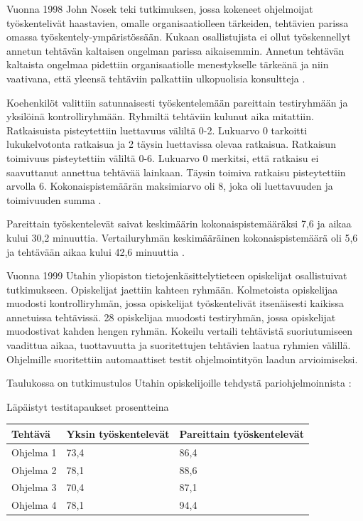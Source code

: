 \documentclass[finnish]{tktltiki2}
\theoremstyle{definition}
\theoremstyle{remark}
\begin{document}
Vuonna 1998 John Nosek teki tutkimuksen, jossa kokeneet ohjelmoijat työskentelivät haastavien, omalle organisaatiolleen tärkeiden, tehtävien parissa omassa työskentely-ympäristössään. Kukaan osallistujista ei ollut työskennellyt annetun tehtävän kaltaisen ongelman parissa aikaisemmin. Annetun tehtävän kaltaista ongelmaa pidettiin organisaatiolle menestykselle tärkeänä ja niin vaativana, että yleensä tehtäviin palkattiin ulkopuolisia konsultteja \cite{NOS98}.

Koehenkilöt valittiin satunnaisesti työskentelemään pareittain testiryhmään ja yksilöinä kontrolliryhmään.
Ryhmiltä tehtäviin kulunut aika mitattiin. Ratkaisuista pisteytettiin luettavuus väliltä 0-2. Lukuarvo 0 tarkoitti lukukelvotonta ratkaisua ja 2 täysin luettavissa olevaa ratkaisua. Ratkaisun toimivuus pisteytettiin väliltä 0-6. Lukuarvo 0 merkitsi, että ratkaisu ei saavuttanut annettua tehtävää lainkaan. Täysin toimiva ratkaisu pisteytettiin arvolla 6. Kokonaispistemäärän maksimiarvo oli 8, joka oli luettavuuden ja toimivuuden summa \cite{NOS98}.

Pareittain työskentelevät saivat keskimäärin kokonaispistemääräksi 7,6 ja aikaa kului 30,2 minuuttia. Vertailuryhmän keskimääräinen kokonaispistemäärä oli 5,6 ja tehtävään aikaa kului 42,6 minuuttia \cite{NOS98}.

Vuonna 1999 Utahin yliopiston tietojenkäsittelytieteen opiskelijat osallistuivat tutkimukseen. Opiskelijat jaettiin kahteen ryhmään. Kolmetoista opiskelijaa muodosti kontrolliryhmän, jossa opiskelijat työskentelivät itsenäisesti kaikissa annetuissa tehtävissä. 28 opiskelijaa muodosti testiryhmän, jossa opiskelijat muodostivat kahden hengen ryhmän. Kokeilu vertaili tehtävistä suoriutumiseen vaadittua aikaa, tuottavuutta ja suoritettujen tehtävien laatua ryhmien välillä. Ohjelmille suoritettiin automaattiset testit ohjelmointityön laadun arvioimiseksi\cite{WIL00}.

Taulukossa on tutkimustulos Utahin opiskelijoille tehdystä pariohjelmoinnista \cite{WIL00}:

Läpäistyt testitapaukset prosentteina
\begin{center}
    \begin{tabular}{ | l | l | p{5cm} |}
    \hline
    Tehtävä & Yksin työskentelevät & Pareittain työskentelevät \\ \hline
    Ohjelma 1 & 73,4 & 86,4 \\ \hline
    Ohjelma 2 & 78,1 & 88,6 \\ \hline
    Ohjelma 3 & 70,4 & 87,1 \\ \hline
    Ohjelma 4 & 78,1 & 94,4 \\ \hline
    \end{tabular}
\end{center}
\end{document}
